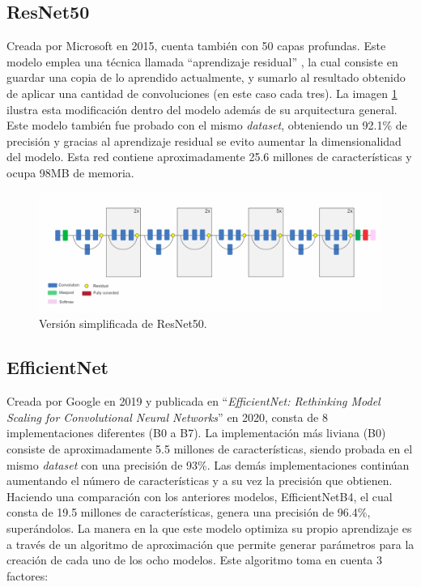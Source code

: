 \subsection{ResNet50}
Creada por Microsoft en 2015, cuenta también con 50 capas profundas. Este modelo emplea 
una técnica llamada ``aprendizaje residual'' \cite{He2015}, la cual consiste en guardar una 
copia de lo aprendido actualmente, y sumarlo al resultado obtenido de aplicar una cantidad de 
convoluciones (en este caso cada tres). La imagen \ref{ResNet} ilustra esta modificación dentro 
del modelo además de su arquitectura general. Este modelo también fue probado con el mismo 
\textit{dataset}, obteniendo un 92.1\% de precisión y gracias al aprendizaje residual se evito 
aumentar la dimensionalidad del modelo. Esta red contiene aproximadamente 25.6 millones de 
características y ocupa 98MB de memoria. 

\begin{figure}[h!]
\includegraphics[width=1\textwidth]{images/ResNet.png}
\centering
\caption{Versión simplificada de ResNet50. \cite{modelos} }
\label{ResNet}
\end{figure}


\subsection{EfficientNet}

Creada por Google en 2019 y publicada en ``\textit{EfficientNet: Rethinking Model 
Scaling for Convolutional Neural Networks}'' \cite{Tan2020} en 2020, consta de 8 
implementaciones diferentes (B0 a B7). La implementación más liviana (B0) consiste 
de aproximadamente 5.5 millones de características, siendo probada en el mismo 
\textit{dataset} con una precisión de 93\%. Las demás implementaciones continúan 
aumentando el número de características y a su vez la precisión que obtienen. Haciendo 
una comparación con los anteriores modelos, EfficientNetB4, el cual consta de 19.5 
millones de características, genera una precisión de 96.4\%, superándolos. La manera 
en la que este modelo optimiza su propio aprendizaje es a través de un algoritmo de 
aproximación que permite generar parámetros para la creación de cada uno de los ocho 
modelos. Este algoritmo toma en cuenta 3 factores:

